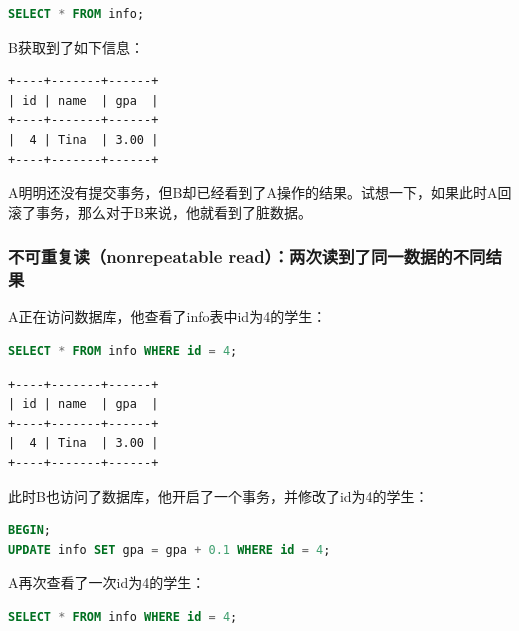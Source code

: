 \documentclass[12pt, openany, oneside]{book}
\begin{document}
\begin{lstlisting}[language=SQL]
SELECT * FROM info;
\end{lstlisting}

B获取到了如下信息：

\begin{tcolorbox}
    \begin{verbatim}
+----+-------+------+
| id | name  | gpa  |
+----+-------+------+
|  4 | Tina  | 3.00 |
+----+-------+------+
	\end{verbatim}
\end{tcolorbox}

A明明还没有提交事务，但B却已经看到了A操作的结果。试想一下，如果此时A回滚了事务，那么对于B来说，他就看到了脏数据。

\subsubsection{不可重复读（nonrepeatable read）：两次读到了同一数据的不同结果}

A正在访问数据库，他查看了info表中id为4的学生：

\vspace{-0.5cm}

\begin{lstlisting}[language=SQL]
SELECT * FROM info WHERE id = 4;
\end{lstlisting}

\begin{tcolorbox}
    \begin{verbatim}
+----+-------+------+
| id | name  | gpa  |
+----+-------+------+
|  4 | Tina  | 3.00 |
+----+-------+------+
	\end{verbatim}
\end{tcolorbox}

此时B也访问了数据库，他开启了一个事务，并修改了id为4的学生：

\vspace{-0.5cm}

\begin{lstlisting}[language=SQL]
BEGIN;
UPDATE info SET gpa = gpa + 0.1 WHERE id = 4;
\end{lstlisting}

A再次查看了一次id为4的学生：

\vspace{-0.5cm}

\begin{lstlisting}[language=SQL]
SELECT * FROM info WHERE id = 4;
\end{lstlisting}
\end{document}
